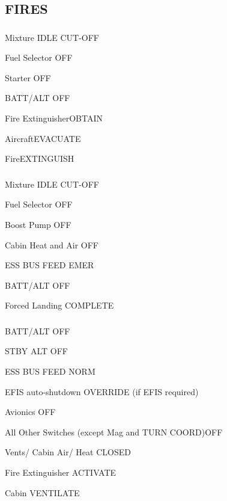 \begin{multicols}{2}
\subsection*{FIRES}
\subsubsection*{}
\begin{enumerate*}
  \item Mixture \dotfill IDLE CUT-OFF
  \item Fuel Selector \dotfill OFF
  \item Starter \dotfill OFF
  \item BATT/ALT \dotfill OFF
  \item Fire Extinguisher\dotfill OBTAIN
  \item Aircraft\dotfill EVACUATE
  \item Fire\dotfill EXTINGUISH
  \end{enumerate*}

\subsubsection*{}
\begin{enumerate*}
\item Mixture \dotfill IDLE CUT-OFF
\item Fuel Selector \dotfill OFF
\item Boost Pump \dotfill OFF
\item Cabin Heat and Air \dotfill OFF
\item ESS BUS FEED \dotfill EMER
\item BATT/ALT \dotfill OFF
\item Forced Landing \dotfill COMPLETE
\end{enumerate*}

\subsubsection*{}

\begin{enumerate*}
\item BATT/ALT \dotfill OFF
\item STBY ALT \dotfill OFF
\item ESS BUS FEED \dotfill NORM
\item EFIS auto-shutdown \dotfill OVERRIDE (if EFIS required)
\item Avionics \dotfill OFF
\item All Other Switches (except Mag and TURN COORD)\dotfill OFF
\item Vents/ Cabin Air/ Heat \dotfill CLOSED
\item Fire Extinguisher \dotfill ACTIVATE
\item Cabin \dotfill VENTILATE
\end{enumerate*}


\end{multicols}
